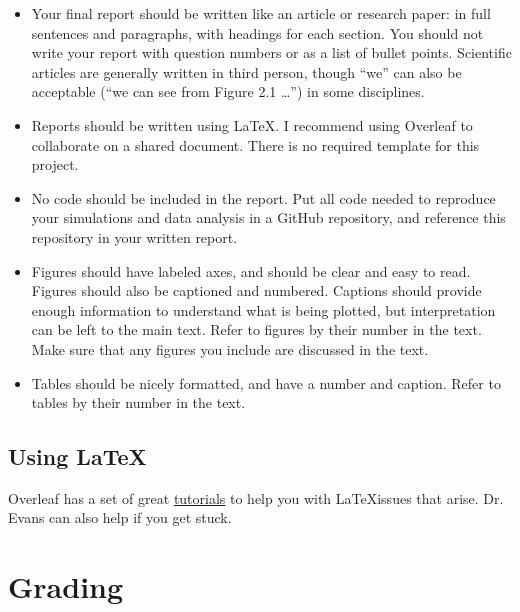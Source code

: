 \documentclass[11pt]{article}
\begin{document}
\begin{itemize}
\item Your final report should be written like an article or research paper: in full sentences and paragraphs, with headings for each section. You should not write your report with question numbers or as a list of bullet points. Scientific articles are generally written in third person, though “we” can also be acceptable (“we can see from Figure 2.1 …”) in some disciplines.

\item Reports should be written using \LaTeX. I recommend using Overleaf to collaborate on a shared document. There is no required template for this project.

\item No code should be included in the report. Put all code needed to reproduce your simulations and data analysis in a GitHub repository, and reference this repository in your written report.

\item Figures should have labeled axes, and should be clear and easy to read. Figures should also be captioned and numbered. Captions should provide enough information to understand what is being plotted, but interpretation can be left to the main text. Refer to figures by their number in the text. Make sure that any figures you include are discussed in the text.

\item Tables should be nicely formatted, and have a number and caption. Refer to tables by their number in the text.
\end{itemize}

\subsection*{Using LaTeX}

Overleaf has a set of great \href{https://www.overleaf.com/learn/latex/Tutorials}{tutorials} to help you with \LaTeX issues that arise. Dr. Evans can also help if you get stuck.

\vspace{0.5cm}

\section*{Grading}
\end{document}
